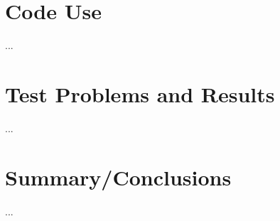 \documentclass[10pt]{article}
\begin{document}
\section{Code Use}

...







\section{Test Problems and Results}

...







\section{Summary/Conclusions}

...








\end{document}
